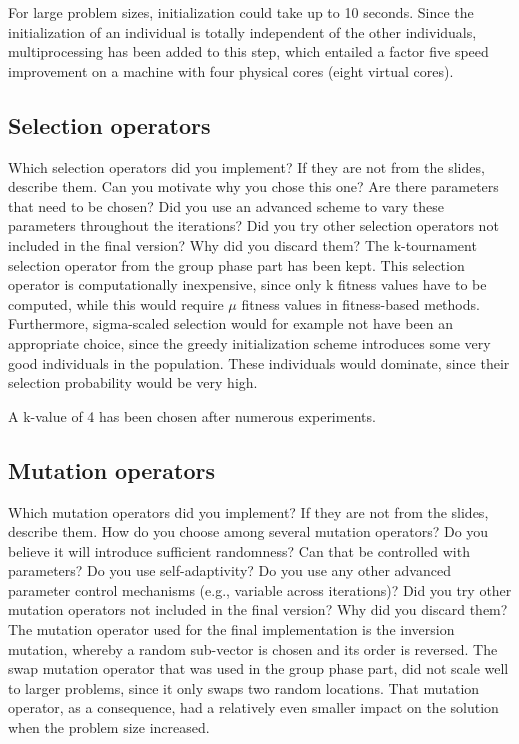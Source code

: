 \documentclass[a4paper,10pt]{article}
\newcommand{\ReplaceMe}[1]{{\color{blue}#1}}
\begin{document}
For large problem sizes, initialization could take up to 10 seconds. Since the initialization of an individual is totally independent of the other individuals, multiprocessing has been added to this step, which entailed a factor five speed improvement on a machine with four physical cores (eight virtual cores).


\subsection{Selection operators}
\label{selection}
\ReplaceMe{Which selection operators did you implement? If they are not from the slides, describe them. Can you motivate why you chose this one? Are there parameters that need to be chosen? Did you use an advanced scheme to vary these parameters throughout the iterations? Did you try other selection operators not included in the final version? Why did you discard them?}
The k-tournament selection operator from the group phase part has been kept. This selection operator is computationally inexpensive, since only k fitness values have to be computed, while this would require $\mu$ fitness values in fitness-based methods. Furthermore, sigma-scaled selection would for example not have been an appropriate choice, since the greedy initialization scheme introduces some very good individuals in the population. These individuals would dominate, since their selection probability would be very high.

A k-value of 4 %
has been chosen after numerous experiments.

\subsection{Mutation operators}
\label{mutation}
\ReplaceMe{Which mutation operators did you implement? If they are not from the slides, describe them. How do you choose among several mutation operators? Do you believe it will introduce sufficient randomness? Can that be controlled with parameters? Do you use self-adaptivity? Do you use any other advanced parameter control mechanisms (e.g., variable across iterations)? Did you try other mutation operators not included in the final version? Why did you discard them?}
The mutation operator used for the final implementation is the inversion mutation, whereby a random sub-vector is chosen and its order is reversed. The swap mutation operator that was used in the group phase part, did not scale well to larger problems, since it only swaps two random locations. That mutation operator, as a consequence, had a relatively even smaller impact on the solution when the problem size increased.
\end{document}
